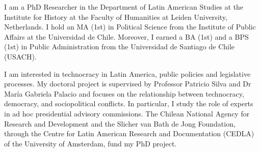 




\par{I am a PhD Researcher in the Department of Latin American Studies at the Institute for History at the Faculty of Humanities at Leiden University, Netherlands. I hold an MA (1st) in Political Science from the Institute of Public Affairs at the Universidad de Chile. Moreover, I earned a BA (1st) and a BPS (1st) in Public Administration from the Universidad de Santiago de Chile (USACH).

I am interested in technocracy in Latin America, public policies and legislative processes. My doctoral project is supervised by Professor Patricio Silva and Dr María Gabriela Palacio and focuses on the relationship between technocracy, democracy, and sociopolitical conflicts. In particular, I study the role of experts in ad hoc presidential advisory commissions. The Chilean National Agency for Research and Development and the Slicher van Bath de Jong Foundation, through the Centre for Latin American Research and Documentation (CEDLA) of the University of Amsterdam, fund my PhD project.}\\